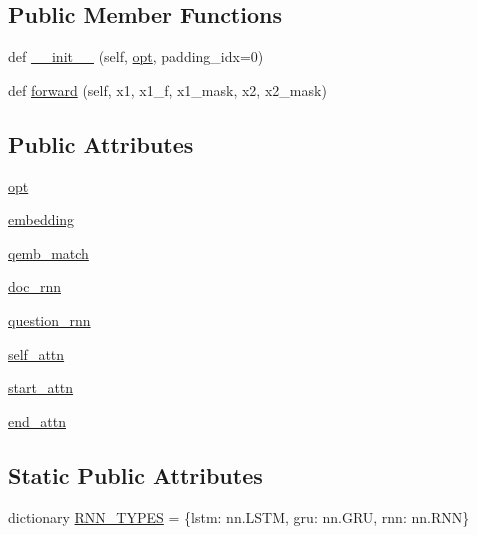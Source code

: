 \subsection*{Public Member Functions}
\begin{DoxyCompactItemize}
\item 
def \hyperlink{classparlai_1_1agents_1_1drqa_1_1rnn__reader_1_1RnnDocReader_aad7ee892d313b0cd61ddeecba9550789}{\+\_\+\+\_\+init\+\_\+\+\_\+} (self, \hyperlink{classparlai_1_1agents_1_1drqa_1_1rnn__reader_1_1RnnDocReader_a65606a7fed62ec853d7dd6863644b417}{opt}, padding\+\_\+idx=0)
\item 
def \hyperlink{classparlai_1_1agents_1_1drqa_1_1rnn__reader_1_1RnnDocReader_ac34674c2a5c3a9b66f10e501725c685a}{forward} (self, x1, x1\+\_\+f, x1\+\_\+mask, x2, x2\+\_\+mask)
\end{DoxyCompactItemize}
\subsection*{Public Attributes}
\begin{DoxyCompactItemize}
\item 
\hyperlink{classparlai_1_1agents_1_1drqa_1_1rnn__reader_1_1RnnDocReader_a65606a7fed62ec853d7dd6863644b417}{opt}
\item 
\hyperlink{classparlai_1_1agents_1_1drqa_1_1rnn__reader_1_1RnnDocReader_ac825a2ff134f93fa9098cab35715fc23}{embedding}
\item 
\hyperlink{classparlai_1_1agents_1_1drqa_1_1rnn__reader_1_1RnnDocReader_a2d7bda1b45827ea5864b64a766bb1ce9}{qemb\+\_\+match}
\item 
\hyperlink{classparlai_1_1agents_1_1drqa_1_1rnn__reader_1_1RnnDocReader_ad0f835adb34168f24a3b391febb1799c}{doc\+\_\+rnn}
\item 
\hyperlink{classparlai_1_1agents_1_1drqa_1_1rnn__reader_1_1RnnDocReader_a6e5d5208e7fb45c3227abf28d965146d}{question\+\_\+rnn}
\item 
\hyperlink{classparlai_1_1agents_1_1drqa_1_1rnn__reader_1_1RnnDocReader_ac1384d422cfcf625385cd1de3691c6b6}{self\+\_\+attn}
\item 
\hyperlink{classparlai_1_1agents_1_1drqa_1_1rnn__reader_1_1RnnDocReader_ad3f35e5ca950ee0bc56ba3dd41f38fdb}{start\+\_\+attn}
\item 
\hyperlink{classparlai_1_1agents_1_1drqa_1_1rnn__reader_1_1RnnDocReader_a1d0098c2e2d1ddbc4fdfc40ddc49da6f}{end\+\_\+attn}
\end{DoxyCompactItemize}
\subsection*{Static Public Attributes}
\begin{DoxyCompactItemize}
\item 
dictionary \hyperlink{classparlai_1_1agents_1_1drqa_1_1rnn__reader_1_1RnnDocReader_a88938b5c3e9017f4e26b2af148917e35}{R\+N\+N\+\_\+\+T\+Y\+P\+ES} = \{\textquotesingle{}lstm\textquotesingle{}\+: nn.\+L\+S\+TM, \textquotesingle{}gru\textquotesingle{}\+: nn.\+G\+RU, \textquotesingle{}rnn\textquotesingle{}\+: nn.\+R\+NN\}
\end{DoxyCompactItemize}


